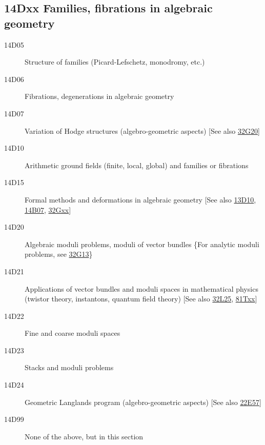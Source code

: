 \documentclass[letterpaper]{article}
\begin{document}
\subsection*{14Dxx Families, fibrations in algebraic geometry}\label{14Dxx}
\begin{description}
\item [14D05]\label{14D05} Structure of families (Picard-Lefschetz, monodromy, etc.)
\item [14D06]\label{14D06} Fibrations, degenerations in algebraic geometry
\item [14D07]\label{14D07} Variation of Hodge structures (algebro-geometric aspects) [See also \hyperref[32G20]{32G20}]
\item [14D10]\label{14D10} Arithmetic ground fields (finite, local, global) and families or fibrations
\item [14D15]\label{14D15} Formal methods and deformations in algebraic geometry [See also \hyperref[13D10]{13D10}, \hyperref[14B07]{14B07}, \hyperref[32Gxx]{32Gxx}]
\item [14D20]\label{14D20} Algebraic moduli problems, moduli of vector bundles \{For analytic moduli problems, see \hyperref[32G13]{32G13}\}
\item [14D21]\label{14D21} Applications of vector bundles and moduli spaces in mathematical physics (twistor theory, instantons, quantum field theory) [See also \hyperref[32L25]{32L25}, \hyperref[81Txx]{81Txx}]
\item [14D22]\label{14D22} Fine and coarse moduli spaces
\item [14D23]\label{14D23} Stacks and moduli problems
\item [14D24]\label{14D24} Geometric Langlands program (algebro-geometric aspects) [See also \hyperref[22E57]{22E57}]
\item [14D99]\label{14D99} None of the above, but in this section
\end{description}          
\end{document}
